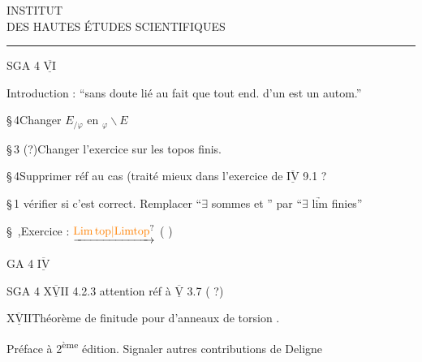 \begin{center}
INSTITUT\\
DES HAUTES ÉTUDES SCIENTIFIQUES\\
\rule{2.3em}{0.4pt}
\end{center}
SGA 4 $\underline{\overline{\mathrm{VI}}}$

Introduction :   ``sans doute lié au fait que tout end. d'un  est un autom.''\unsure{)}

\S\,4\qquad Changer \(E_{/\varphi}\) en \({}_{\varphi}\backslash E\)

\S\,3 (?)\qquad Changer l'exercice sur les topos finis.

\S\,4\qquad Supprimer réf au cas  (traité mieux dans l'exercice de $\underline{\overline{\mathrm{IV}}}$ 9.1 ?

\S\,1\unsure{,\ldots|,\textendash|\ldots} vérifier si c'est correct. Remplacer ``$\exists$ sommes  et '' par ``$\exists$ $\underrightarrow{\mathrm{lim}}$ finies''

\S\ ,\qquad Exercice : $\underrightarrow{\unsure{\mathrm{Lim\,top}|\mathrm{Limtop}}}$ ( )

GA 4 $\underline{\overline{\mathrm{IV}}}$

SGA 4 $\underline{\overline{\mathrm{XVII}}}$ 4.2.3 attention réf à $\underline{\overline{\mathrm{V}}}$ 3.7 ( ?)

$\underline{\overline{\mathrm{XVII}}}$\qquad Théorème de finitude pour  d'anneaux de torsion .

Préface à 2\textsuperscript{ème} édition. Signaler autres contributions de Deligne

